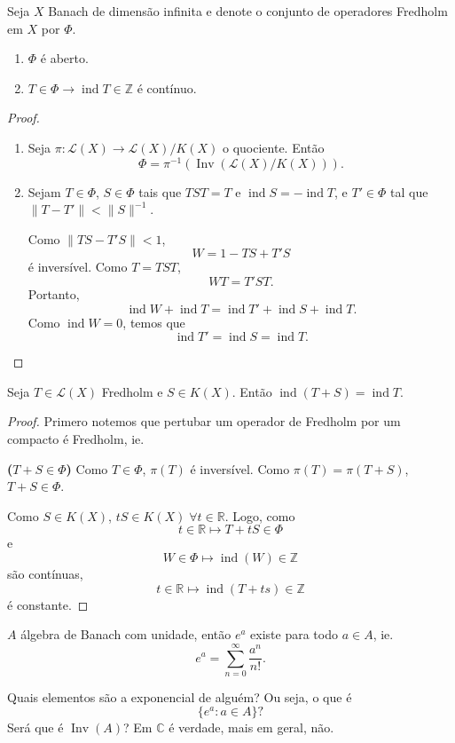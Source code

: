 \documentclass[portuguese]{article}
\theoremstyle{definition}
\newcommand{\R}{\mathbb{R}}
\newcommand{\Z}{\mathbb{Z}}
\newcommand{\C}{\mathbb{C}}
\begin{document}
\begin{teo}
	Seja $X$ Banach de dimensão infinita e denote o conjunto de operadores Fredholm em $X$ por $\Phi$.
	\begin{enumerate}
		\item $\Phi$ é aberto.
		\item $T\in\Phi\to\operatorname{ind}T\in\Z$ é contínuo.
	\end{enumerate}
\end{teo}
\begin{proof}\leavevmode
	\begin{enumerate}
		\item Seja $\pi:\mathcal{L}(X)\to\mathcal{L}(X)/K(X)$ o quociente. Então
		\[\Phi=\pi^{-1}(\operatorname{Inv}(\mathcal{L}(X)/K(X))).\]
		\item Sejam $T\in\Phi$, $S\in\Phi$ tais que $TST=T$ e $\operatorname{ind}S=-\operatorname{ind}T$, e $T'\in\Phi$ tal que $\|T-T'\|<\|S\|^{-1}$.
		
		Como $\|TS-T'S\|<1$,
		\[W=1-TS+T'S\]
		é inversível. Como $T=TST$,
		\[WT=T'ST.\]
		Portanto,
		\[\operatorname{ind}W+\operatorname{ind}T=\operatorname{ind}T'+\operatorname{ind}S+\operatorname{ind}T.\]
		Como $\operatorname{ind}W=0$, temos que
		\[\operatorname{ind}T'=\operatorname{ind}S=\operatorname{ind}T.\]
	\end{enumerate}
\end{proof}
\begin{coro}
	Seja $T\in\mathcal{L}(X)$ Fredholm e $S\in K(X)$. Então $\operatorname{ind}(T+S)=\operatorname{ind}T$.
\end{coro}
\begin{proof}
	Primero notemos que pertubar um operador de Fredholm por um compacto é Fredholm, ie.
	
	\textbf{($T+S\in\Phi$)} Como $T\in\Phi$, $\pi(T)$ é inversível. Como $\pi(T)=\pi(T+S)$, $T+S\in\Phi$.
	
	Como $S\in K(X)$, $tS\in K(X)\;\forall t\in\R$. Logo, como
	\[t\in\R\mapsto T+tS\in\Phi\]
	e
	\[W\in\Phi\mapsto\operatorname{ind}(W)\in\Z\]
	são contínuas,
	\[t\in\R\mapsto\operatorname{ind}(T+ts)\in\Z\]
	é constante.
\end{proof}
\begin{obs}[Relembre]
	$A$ álgebra de Banach com unidade, então $e^a$ existe para todo $a\in A$, ie.
	\[e^a=\sum_{n=0}^\infty\frac{a^n}{n!}.\]
\end{obs}
\begin{pregunta}
	Quais elementos são a exponencial de alguém? Ou seja, o que é
	\[\{e^a:a\in A\}?\]
	Será que é $\operatorname{Inv}(A)$? Em $\C$ é verdade, mais em geral, não.
\end{pregunta}
\end{document}
